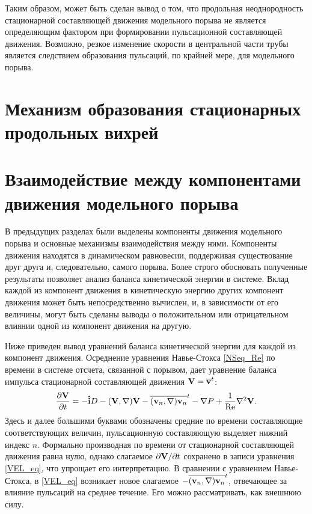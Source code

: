 Таким образом, может быть сделан вывод о том, что продольная неоднородность стационарной составляющей движения модельного порыва не является определяющим фактором при формировании пульсационной составляющей движения. Возможно, резкое изменение скорости в центральной части трубы является следствием образования пульсаций, по крайней мере, для модельного порыва. 

\section{Механизм образования стационарных продольных вихрей}



\section{Взаимодействие между компонентами движения модельного порыва}

В предыдущих разделах были выделены компоненты движения модельного порыва и основные механизмы взаимодействия между ними. Компоненты движения находятся в динамическом равновесии, поддерживая существование друг друга и, следовательно, самого порыва. Более строго обосновать полученные результаты позволяет анализ баланса кинетической энергии в системе. Вклад каждой из компонент движения в кинетическую энергию других компонент движения может быть непосредственно вычислен, и, в зависимости от его величины, могут быть сделаны выводы о положительном или отрицательном влиянии одной из компонент движения на другую. 

Ниже приведен вывод уравнений баланса кинетической энергии для каждой из компонент движения. 
Осреднение уравнения Навье-Стокса \eqref{NSeq_Re} по времени в системе отсчета, связанной с порывом, дает уравнение баланса импульса стационарной составляющей движения $\mathbf{V} = \overline{\mathbf{v}}^t$:
\begin{equation} \label{VEL_eq}
\frac{\partial \mathbf{V}}{\partial t} =  - \mathbf{\hat{i}} D - (\mathbf{V}, \nabla) \mathbf{V} - \overline{(\mathbf{v}_n, \nabla) \mathbf{v}_n}^t - \nabla P + \frac{1}{\operatorname{Re}} \nabla^2 \mathbf{V}.
\end{equation}
Здесь и далее большими буквами обозначены средние по времени составляющие соответствующих величин, пульсационную составляющую выделяет нижний индекс $n$. Формально производная по времени от стационарной составляющей движения равна нулю, однако слагаемое $\partial \mathbf{V}/ \partial t$ сохранено в записи уравнения \eqref{VEL_eq}, что упрощает его интерпретацию. В сравнении с уравнением Навье-Стокса, в \eqref{VEL_eq} возникает новое слагаемое $-\overline{(\mathbf{v}_n, \nabla) \mathbf{v}_n}^t$, отвечающее за влияние пульсаций на среднее течение. Его можно рассматривать, как внешнюю силу. 

